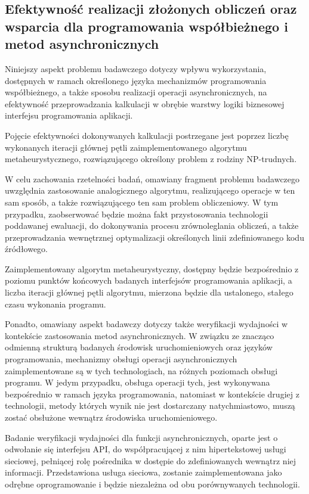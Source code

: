 \subsection*{Efektywność realizacji złożonych obliczeń oraz wsparcia dla programowania współbieżnego i metod asynchronicznych}
Niniejszy aspekt problemu badawczego dotyczy wpływu wykorzystania, dostępnych w ramach określonego języka mechanizmów programowania współbieżnego, a także sposobu realizacji operacji asynchronicznych, na efektywność przeprowadzania kalkulacji w obrębie warstwy logiki biznesowej interfejsu programowania aplikacji.

Pojęcie efektywności dokonywanych kalkulacji postrzegane jest poprzez liczbę wykonanych iteracji głównej pętli zaimplementowanego algorytmu metaheurystycznego, rozwiązującego określony problem z rodziny NP-trudnych.

W celu zachowania rzetelności badań, omawiany fragment problemu badawczego uwzględnia zastosowanie analogicznego algorytmu, realizującego operacje w ten sam sposób, a także rozwiązującego ten sam problem obliczeniowy. W tym przypadku, zaobserwować będzie można fakt przystosowania technologii poddawanej ewaluacji, do dokonywania procesu zrównoleglania obliczeń, a także przeprowadzania wewnętrznej optymalizacji określonych linii zdefiniowanego kodu źródłowego.

Zaimplementowany algorytm metaheurystyczny, dostępny będzie bezpośrednio z poziomu punktów końcowych badanych interfejsów programowania aplikacji, a liczba iteracji głównej pętli algorytmu, mierzona będzie dla ustalonego, stałego czasu wykonania programu.

Ponadto, omawiany aspekt badawczy dotyczy także weryfikacji wydajności w kontekście zastosowania metod asynchronicznych. W związku ze znacząco odmienną strukturą badanych środowisk uruchomieniowych oraz języków programowania, mechanizmy obsługi operacji asynchronicznych zaimplementowane są w tych technologiach, na różnych poziomach obsługi programu. W jedym przypadku, obsługa operacji tych, jest wykonywana bezpośrednio w ramach języka programowania, natomiast w kontekście drugiej z technologii, metody których wynik nie jest dostarczany natychmiastowo, muszą zostać obsłużone wewnątrz środowiska uruchomieniowego.

Badanie weryfikacji wydajności dla funkcji asynchronicznych, oparte jest o odwołanie się interfejsu API, do współpracującej z nim hipertekstowej usługi sieciowej, pełniącej rolę pośrednika w dostępie do zdefiniowanych wewnątrz niej informacji. Przedstawiona usługa sieciowa, zostanie zaimplementowana jako odrębne oprogramowanie i będzie niezależna od obu porównywanych technologii.

